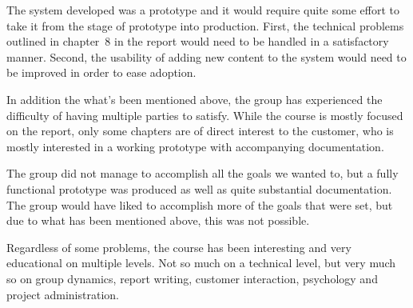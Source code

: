 \documentclass[11pt]{article}
\begin{document}
The system developed was a prototype and it would require quite some effort to take it from the stage of prototype into production. First, the technical problems outlined in chapter~8 in the report would need to be handled in a satisfactory manner. Second, the usability of adding new content to the system would need to be improved in order to ease adoption.

In addition the what's been mentioned above, the group has experienced the difficulty of having multiple parties to satisfy. While the course is mostly focused on the report, only some chapters are of direct interest to the customer, who is mostly interested in a working prototype with accompanying documentation.

The group did not manage to accomplish all the goals we wanted to, but a fully functional prototype was produced as well as quite substantial documentation. The group would have liked to accomplish more of the goals that were set, but due to what has been mentioned above, this was not possible.

Regardless of some problems, the course has been interesting and very educational on multiple levels. Not so much on a technical level, but very much so on group dynamics, report writing, customer interaction, psychology and project administration.
\end{document}
